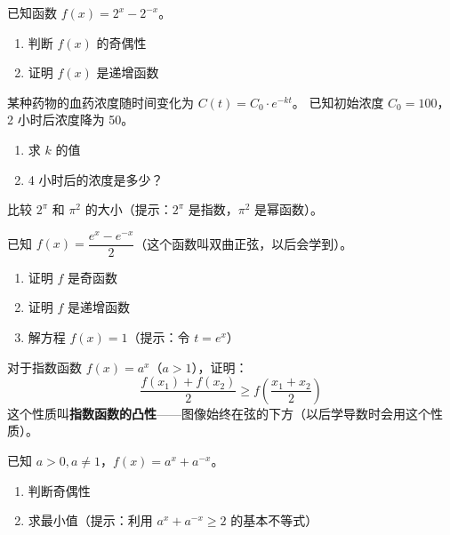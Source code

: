 \begin{exercise}[5]
已知函数 \(f(x) = 2^x - 2^{-x}\)。
\begin{enumerate}
  \item[(1)] 判断 \(f(x)\) 的奇偶性
  \item[(2)] 证明 \(f(x)\) 是递增函数
\end{enumerate}
\end{exercise}

\begin{exercise}[5]
某种药物的血药浓度随时间变化为 \(C(t) = C_0 \cdot e^{-kt}\)。
已知初始浓度 \(C_0 = 100\)，2 小时后浓度降为 50。
\begin{enumerate}
  \item[(1)] 求 \(k\) 的值
  \item[(2)] 4 小时后的浓度是多少？
\end{enumerate}
\end{exercise}

\begin{exercise}[5]
比较 \(2^{\pi}\) 和 \(\pi^2\) 的大小（提示：\(2^\pi\) 是指数，\(\pi^2\) 是幂函数）。
\end{exercise}


\begin{exercise}[6]
已知 \(f(x) = \dfrac{e^x - e^{-x}}{2}\)（这个函数叫双曲正弦，以后会学到）。
\begin{enumerate}
  \item[(1)] 证明 \(f\) 是奇函数
  \item[(2)] 证明 \(f\) 是递增函数
  \item[(3)] 解方程 \(f(x) = 1\)（提示：令 \(t = e^x\)）
\end{enumerate}
\end{exercise}

\begin{exercise}[6]
对于指数函数 \(f(x) = a^x\)（\(a > 1\)），证明：
\[
\frac{f(x_1) + f(x_2)}{2} \ge f\left(\frac{x_1 + x_2}{2}\right)
\]
这个性质叫\textbf{指数函数的凸性}——图像始终在弦的下方（以后学导数时会用这个性质）。
\end{exercise}

\begin{exercise}[6]
已知 \(a > 0, a \neq 1\)，\(f(x) = a^{x} + a^{-x}\)。
\begin{enumerate}
  \item[(1)] 判断奇偶性
  \item[(2)] 求最小值（提示：利用 \(a^x + a^{-x} \ge 2\) 的基本不等式）
\end{enumerate}
\end{exercise}

